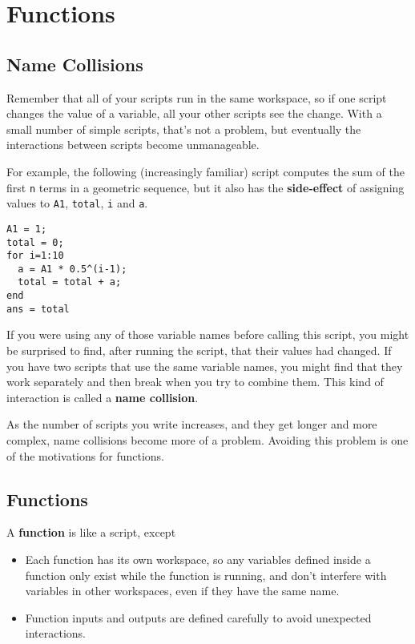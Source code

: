 
\chapter{Functions}

\section{Name Collisions}

Remember that all of your scripts run in the same workspace, so
if one script changes the value of a variable, all your other
scripts see the change. With a small number of simple scripts,
that's not a problem, but eventually the interactions between
scripts become unmanageable.

For example, the following (increasingly familiar) script computes the
sum of the first {\tt n} terms in a geometric sequence, but it also
has the {\bf side-effect} of assigning values to {\tt A1}, {\tt total},
{\tt i} and {\tt a}.

\begin{verbatim}
A1 = 1;
total = 0;
for i=1:10
  a = A1 * 0.5^(i-1);
  total = total + a;
end
ans = total
\end{verbatim}

If you were using any of those variable names before calling this
script, you might be surprised to find, after running the script,
that their values had changed. If you have two scripts that use
the same variable names, you might find that they work separately
and then break when you try to combine them. This kind of
interaction is called a {\bf name collision}.

As the number of scripts you write increases, and they get longer
and more complex, name collisions become more of a problem. Avoiding
this problem is one of the motivations for functions.


\section{Functions}
\label{functions}

A {\bf function} is like a script, except

\begin{itemize}

\item Each function has its own workspace, so any variables defined
inside a function only exist while the function is running, and don't
interfere with variables in other workspaces, even if they have the
same name.

\item Function inputs and outputs are defined carefully to avoid
unexpected interactions.

\end{itemize}

